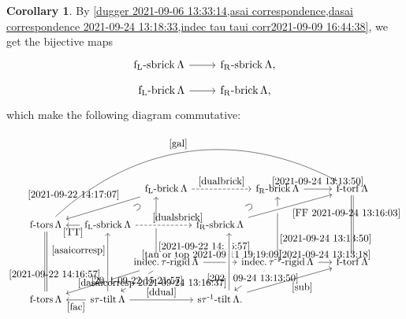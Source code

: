 \documentclass[pdftex,a4paper]{article}
\numberwithin{equation}{subsection}
\theoremstyle{definition}
\newtheorem{corollary}[theorem]{Corollary}
\newcommand{\stautilt}{\operatorname{\mathrm{s\tau-tilt}}}
\newcommand{\itaurigid}{\operatorname{\mathrm{indec.\tau-rigid}}}
\newcommand{\itauirigid}{\operatorname{\mathrm{indec.\tau^{-1}-rigid}}}
\newcommand{\stauitilt}{\operatorname{\mathrm{s\tau^{-1}-tilt}}}
\newcommand{\ftors}{\operatorname{\mathrm{f-tors}}}
\newcommand{\ftorf}{\operatorname{\mathrm{f-torf}}}
\newcommand{\flsbrick}{\operatorname{\mathrm{f_L-sbrick}}}
\newcommand{\flbrick}{\operatorname{\mathrm{f_L-brick}}}
\newcommand{\frsbrick}{\operatorname{\mathrm{f_R-sbrick}}}
\newcommand{\frbrick}{\operatorname{\mathrm{f_R-brick}}}
\begin{document}
\begin{corollary}\label{comm dbrick 2021-10-01 20:08:26}
	By \cref{dugger 2021-09-06 13:33:14,asai correspondence,dasai correspondence 2021-09-24 13:18:33,indec tau taui corr2021-09-09 16:44:38}, we get the bijective maps
	\begin{equation}\label{dualsbrick}
		\begin{tikzcd}
			\flsbrick \Lambda\ar[r]&\frsbrick \Lambda,
		\end{tikzcd}
	\end{equation}
	\begin{equation}\label{dualbrick}
		\begin{tikzcd}
			\flbrick \Lambda\ar[r]&\frbrick \Lambda,
		\end{tikzcd}
	\end{equation}
	which make the following diagram commutative:
	\begin{equation}\label{cdtaubricktor 2021-09-06 15:51:24}
		\begin{tikzcd}[row sep=20pt]
			&[-10pt]&[-30pt] \flbrick \Lambda \ar[dl,phantom,"\supset"sloped] \ar[dll,near start,"\eqref{2021-09-22 14:17:07}"'] \ar[rr,dashrightarrow,"\eqref{dualbrick}"] \ar[dd,leftarrow,"\eqref{2021-09-22 14:16:57}",very near end,xshift=-10pt] &[-35pt] &[-35pt] \frbrick \Lambda \ar[dl,phantom,"\supset"sloped] \ar[dd, leftarrow,"\eqref{2021-09-24 13:13:50}",near end] \ar[r,"\eqref{2021-09-24 13:13:50}"]&[-10pt]\ftorf \Lambda \ar[dd, equal]\\
			\ftors \Lambda \ar[dd,equal]\ar[urrrrr,bend left=35pt,"\eqref{gal}"]&\ar[l,"\eqref{TT}"]\flsbrick \Lambda \ar[rr,dashrightarrow, crossing over,"\eqref{dualsbrick}",near end] & & \frsbrick \Lambda \ar[urr,crossing over,"\eqref{FF 2021-09-24 13:16:03}"'] &\\
			&& \itaurigid \Lambda \ar[dl,"\eqref{2021-09-22 15:21:57}"description]\ar[dll,"\eqref{2021-09-22 14:16:57}"'] \ar[rr,near start,"\eqref{tau or top 2021-09-11 19:19:09}"] & & \itauirigid \Lambda \ar[dl,pos=0.4,"\eqref{2021-09-24 13:13:50}"description] \ar[r,"\eqref{2021-09-24 13:13:18}"]&\ftorf \Lambda \\
			\ftors \Lambda&\stautilt \Lambda \ar[l,"\eqref{fac}"] \ar[uu,pos=0.7,crossing over,"\eqref{asaicorresp}"]\ar[rr,"\eqref{ddual}"] & & \stauitilt \Lambda \ar[uu,rightarrow,very near start,xshift=9pt,crossing over,"\eqref{dasaicorresp 2021-09-24 13:16:37}"] \ar[urr,"\eqref{sub}"'].&\\
		\end{tikzcd}
	\end{equation}

\end{corollary}
\end{document}

